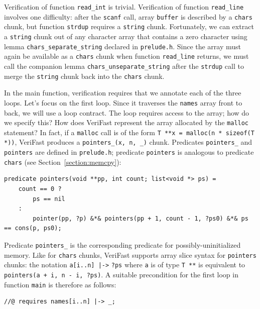 \documentclass{article}
\begin{document}
Verification of function \lstinline!read_int! is trivial.
Verification of function \lstinline!read_line! involves one
difficulty: after the \lstinline!scanf! call, array
\lstinline!buffer! is described by a \lstinline!chars! chunk,
but function \lstinline!strdup! requires a \lstinline!string!
chunk. Fortunately, we can extract a \lstinline!string! chunk
out of any character array that contains a zero character using
lemma \lstinline!chars_separate_string! declared in
\lstinline!prelude.h!. Since the array must again be available
as a \lstinline!chars! chunk when function
\lstinline!read_line! returns, we must call the companion lemma
\lstinline!chars_unseparate_string! after the
\lstinline!strdup! call to merge the \lstinline!string! chunk
back into the \lstinline!chars! chunk.

In the main function, verification requires that we annotate
each of the three loops. Let's focus on the first loop. Since
it traverses the \lstinline!names! array front to back, we will
use a loop contract. The loop requires access to the array; how
do we specify this? How does VeriFast represent the array
allocated by the \lstinline!malloc! statement? In fact, if a
\lstinline!malloc! call is of the form %
\lstinline!T **x = malloc(n * sizeof(T *))!, VeriFast produces
a \lstinline!pointers_(x, n, _)! chunk. Predicates
\lstinline!pointers_! and \lstinline|pointers| are defined in \lstinline!prelude.h!; predicate \lstinline!pointers! is
analogous to predicate \lstinline!chars! (see
Section~\ref{section:memcpy}):
\begin{lstlisting}
predicate pointers(void **pp, int count; list<void *> ps) =
    count == 0 ?
        ps == nil
    :
        pointer(pp, ?p) &*& pointers(pp + 1, count - 1, ?ps0) &*& ps == cons(p, ps0);
\end{lstlisting}
Predicate \lstinline!pointers_! is the corresponding predicate for possibly-uninitialized memory.
Like for \lstinline!chars! chunks, VeriFast supports array
slice syntax for \lstinline!pointers! chunks: the notation
\lstinline!a[i..n] |->! \lstinline!?ps! where \lstinline!a! is
of type
\lstinline!T **! is equivalent to %
\lstinline!pointers(a + i, n - i, ?ps)!. A suitable
precondition for the first loop in function \lstinline!main! is
therefore as follows:
\begin{lstlisting}
//@ requires names[i..n] |-> _;
\end{lstlisting}
\end{document}

